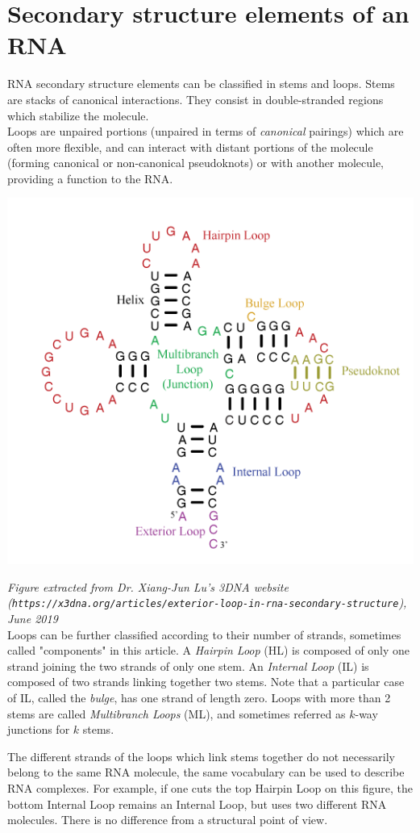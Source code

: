 \documentclass{article}
\begin{document}
\appendix
\section{Secondary structure elements of an RNA}
RNA secondary structure elements can be classified in stems and loops. Stems are stacks of canonical interactions. They consist in double-stranded regions which stabilize the molecule. \\
Loops are unpaired portions (unpaired in terms of \textit{canonical} pairings) which are often more flexible, and can interact with distant portions of the molecule (forming canonical or non-canonical pseudoknots) or with another molecule, providing a function to the RNA.

\begin{center}\includegraphics[width=0.5\linewidth]{fig/RNA_SSE.png}\end{center}
\textit{\scriptsize Figure extracted from Dr. Xiang-Jun Lu's 3DNA website (\texttt{https://x3dna.org/articles/exterior-loop-in-rna-secondary-structure}), June 2019}\\

Loops can be further classified according to their number of strands, sometimes called "components" in this article. A \textit{Hairpin Loop} (HL) is composed of only one strand joining the two strands of only one stem. An \textit{Internal Loop} (IL) is composed of two strands linking together two stems. Note that a particular case of IL, called the \textit{bulge}, has one strand of length zero. Loops with more than 2 stems are called \textit{Multibranch Loops} (ML), and sometimes referred as $k$-way junctions for $k$ stems.

The different strands of the loops which link stems together do not necessarily belong to the same RNA molecule, the same vocabulary can be used to describe RNA complexes. For example, if one cuts the top Hairpin Loop on this figure, the bottom Internal Loop remains an Internal Loop, but uses two different RNA molecules. There is no difference from a structural point of view.
\end{document}
